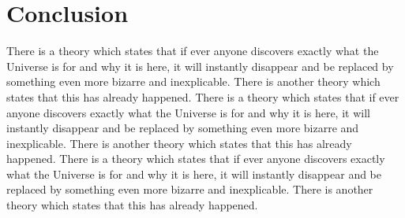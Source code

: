 \section{Conclusion}
    There is a theory which states that if ever anyone discovers 
    exactly what the Universe is for and why it is here, 
    it will instantly disappear and be replaced by something even more bizarre and inexplicable.
    There is another theory which states that this has already happened.
    \citep{adams1995hitchhiker}
    There is a theory which states that if ever anyone discovers 
    exactly what the Universe is for and why it is here, 
    it will instantly disappear and be replaced by something even more bizarre and inexplicable.
    There is another theory which states that this has already happened.
    There is a theory which states that if ever anyone discovers 
    exactly what the Universe is for and why it is here, 
    it will instantly disappear and be replaced by something even more bizarre and inexplicable.
    There is another theory which states that this has already happened.
    \citep{adams1995hitchhiker2}